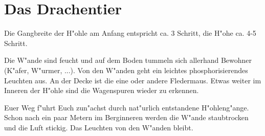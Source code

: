 \chapter{Das Drachentier}
\par Die Gangbreite der H"ohle am Anfang entspricht ca. 3 Schritt, die H"ohe ca. 4-5 Schritt.
\par Die W"ande sind feucht und auf dem Boden tummeln sich allerhand \glqq Bewohner\grqq{} (K"afer, W"urmer, ...). Von den W"anden geht ein leichtes phosphorisierendes Leuchten aus. An der Decke ist die eine oder andere Fledermaus. Etwas weiter im Inneren der H"ohle sind die Wagenspuren wieder zu erkennen.
\par Euer Weg f"uhrt Euch zun"achst durch nat"urlich entstandene H"ohleng"ange. Schon nach ein paar Metern im Berginneren werden die W"ande staubtrocken und die Luft stickig. Das Leuchten von den W"anden bleibt.

